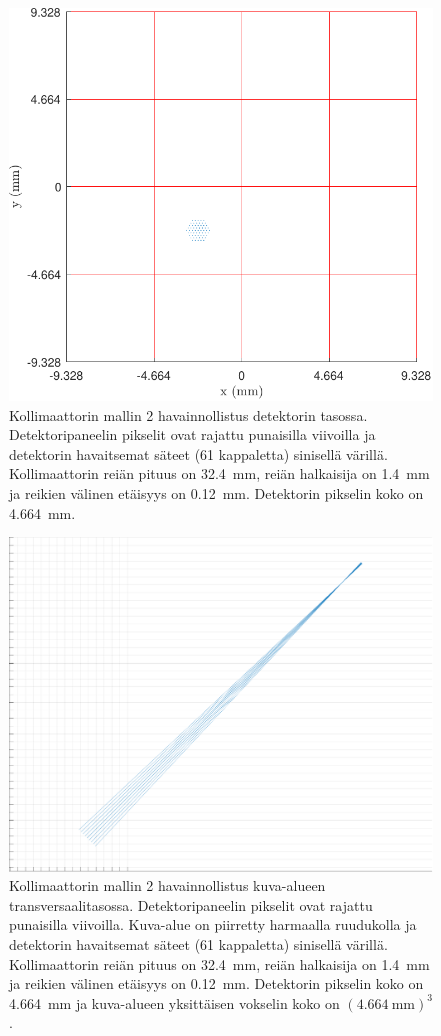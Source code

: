 \begin{figure}[H]
    \centering
    \captionsetup{width=.9\linewidth}
    \includegraphics[width=.9\linewidth]{kuvat/malli2_2D.pdf}
    \caption{Kollimaattorin mallin 2 havainnollistus detektorin tasossa. Detektoripaneelin pikselit ovat rajattu punaisilla viivoilla ja detektorin havaitsemat säteet (61 kappaletta) sinisellä värillä. Kollimaattorin reiän pituus on \qty{32.4}{\milli\meter}, reiän halkaisija on \qty{1.4}{\milli\meter} ja reikien välinen etäisyys on \qty{0.12}{\milli\meter}. Detektorin pikselin koko on \qty{4.664}{\milli\meter}.}
    \label{fig:ray2_2D}
\end{figure}
\begin{figure}[H]
    \centering
    \captionsetup{width=.9\linewidth}
    \includegraphics[width=.9\linewidth]{kuvat/malli2_3D.pdf}
    \caption{Kollimaattorin mallin 2 havainnollistus kuva-alueen transversaalitasossa. Detektoripaneelin pikselit ovat rajattu punaisilla viivoilla. Kuva-alue on piirretty harmaalla ruudukolla ja detektorin havaitsemat säteet (61 kappaletta) sinisellä värillä. Kollimaattorin reiän pituus on \qty{32.4}{\milli\meter}, reiän halkaisija on \qty{1.4}{\milli\meter} ja reikien välinen etäisyys on \qty{0.12}{\milli\meter}. Detektorin pikselin koko on \qty{4.664}{\milli\meter} ja kuva-alueen yksittäisen vokselin koko on $(\qty{4.664}{\milli\meter})^{3}$.}
    \label{fig:ray2_3D}
\end{figure}
